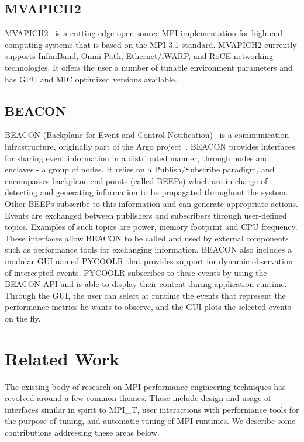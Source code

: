 \subsection{MVAPICH2}
MVAPICH2~\cite{MVAPICH2} is a cutting-edge open source MPI implementation for high-end computing systems that is based on the MPI 3.1 standard. MVAPICH2 currently supports InfiniBand, Omni-Path, Ethernet/iWARP, and RoCE networking technologies. It offers the user a number of tunable environment parameters and has GPU and MIC optimized versions available.

\subsection{BEACON}
BEACON (Backplane for Event and Control Notification)~\cite{BEACON} is a communication infrastructure, originally part of the Argo project~\cite{Perarnau:2015:DMM:2960986.2961000}.
BEACON provides interfaces for sharing event information in a distributed manner, through nodes and enclaves - a group of nodes.
It relies on a Publish/Subscribe paradigm, and encompasses backplane end-points (called BEEPs) which are in charge of detecting and generating information to be propagated throughout the system.
Other BEEPs subscribe to this information and can generate appropriate actions.  
Events are exchanged between publishers and subscribers through user-defined topics. Examples of such topics are power, memory footprint and CPU frequency.
These interfaces allow BEACON to be called and used by external components such as performance tools for exchanging information.
BEACON also includes a modular GUI named PYCOOLR that provides support for dynamic observation of intercepted events. PYCOOLR subscribes to these events by using the BEACON API and is able to display their content during application runtime. Through the GUI, the user can select at runtime the events that represent the performance metrics he wants to observe, and the GUI plots the selected events on the fly.


\section{Related Work}
The existing body of research on MPI performance engineering techniques has revolved around a few common themes. These include design and usage of interfaces similar in spirit to MPI\_T, user interactions with performance tools for the purpose of tuning, and automatic tuning of MPI runtimes. We describe some contributions addressing these areas below.
